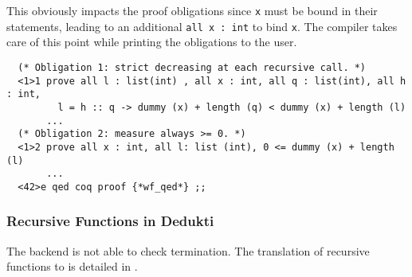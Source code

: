 This obviously impacts the proof obligations since {\tt x} must be
bound in their statements, leading to an additional
\lstinline"all x : int" to bind {\tt x}. The compiler takes care of
this point while printing the obligations to the user.

\noindent
{\scriptsize
\begin{lstlisting}
  (* Obligation 1: strict decreasing at each recursive call. *)
  <1>1 prove all l : list(int) , all x : int, all q : list(int), all h : int,
         l = h :: q -> dummy (x) + length (q) < dummy (x) + length (l)
       ...
  (* Obligation 2: measure always >= 0. *)
  <1>2 prove all x : int, all l: list (int), 0 <= dummy (x) + length (l)
       ...
  <42>e qed coq proof {*wf_qed*} ;;
\end{lstlisting}
}

\subsubsection{Recursive Functions in Dedukti}

The {\dedukti} backend is not able to check termination. The
translation of recursive functions to {\dedukti} is detailed in
\cite{focalide}.
